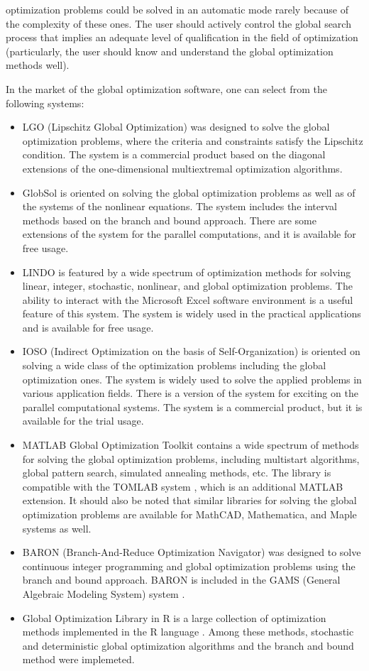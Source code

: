 \documentclass{aims}
\theoremstyle{definition}
\begin{document}
optimization problems could be solved in an automatic mode rarely because of the
complexity of these ones. The user should actively control the global search
process that implies an adequate level of qualification in the field of optimization
(particularly, the user should know and understand the global optimization methods well).
\par
In the market of the global optimization software, one can select from the following systems:
\begin{itemize}
\item LGO (Lipschitz Global Optimization) \cite{pinterGO} was designed to solve the global
optimization problems, where the criteria and constraints satisfy the Lipschitz condition.
The system is a commercial product based on the diagonal extensions of the one-dimensional multiextremal optimization algorithms.
\item GlobSol \cite{kearfott2009} is oriented on solving the global optimization
problems as well as of the systems of the nonlinear equations. The system includes
the interval methods based on the branch and bound approach. There are some extensions
of the system for the parallel computations, and it is available for free usage.
\item LINDO \cite{linSchrage2009} is featured by a wide spectrum of optimization methods for solving linear, integer, stochastic, nonlinear, and global optimization problems. The ability to interact with the Microsoft Excel software environment is a useful feature of this system. The system is widely used in the practical applications and is available for free usage.
\item IOSO (Indirect Optimization on the basis of Self-Organization) \cite{iosoDescription} is oriented on solving a wide class of the optimization problems including the global optimization ones. The system is widely used to solve the applied problems in various application fields. There is a version of the system for exciting on the parallel computational systems. The system is a commercial product, but it is available for the trial usage.
\item MATLAB Global Optimization Toolkit \cite{venkataraman2009} contains a wide
spectrum of methods for solving the global optimization problems, including multistart
algorithms, global pattern search, simulated annealing methods, etc. The library is
compatible with the TOMLAB system \cite{holmstromEdvall2004}, which is an additional
MATLAB extension. It should also be noted that similar libraries for solving the global
optimization problems are available for MathCAD, Mathematica, and Maple systems as well.
\item BARON (Branch-And-Reduce Optimization Navigator) \cite{sahinidis1996} was designed to
solve continuous integer programming and global optimization problems using the branch and
bound approach. BARON is included in the GAMS (General Algebraic Modeling System) system \cite{bussieckMeeraus2004}.
\item Global Optimization Library in R is a large collection of optimization methods
implemented in the R language \cite{mullen2014}. Among these methods, stochastic and
deterministic global optimization algorithms and the branch and bound method were implemeted.
\end{itemize}
\end{document}
